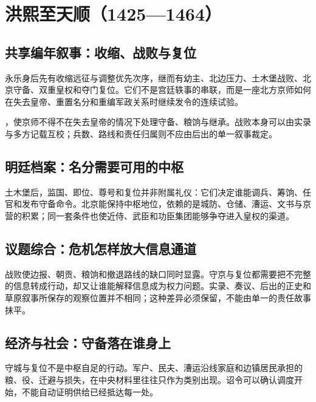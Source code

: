 \chapter{洪熙至天顺（1425—1464）}
\label{ch:hongxi-tianshun}

\section{共享编年叙事：收缩、战败与复位}

永乐身后先有收缩远征与调整优先次序，继而有幼主、北边压力、土木堡战败、北京守备、双重皇权和夺门复位。它们不是宫廷轶事的串联，而是一座北方京师如何在失去皇帝、重置名分和重编军政关系时继续发令的连续试验。

\begin{turningpoint}
，使京师不得不在失去皇帝的情况下处理守备、粮饷与继承。战败本身可以由实录与多方记载互校；兵数、路线和责任归属则不应由后出的单一叙事裁定。
\end{turningpoint}




\section{明廷档案：名分需要可用的中枢}

土木堡后，监国、即位、尊号和复位并非附属礼仪：它们决定谁能调兵、筹饷、任官和发布守备命令。北京能保持中枢地位，依赖的是城防、仓储、漕运、文书与京营的积累；同一套条件也使近侍、武臣和功臣集团能够争夺进入皇权的渠道。

\section{议题综合：危机怎样放大信息通道}

战败使边报、朝贡、粮饷和撤退路线的缺口同时显露。守京与复位都需要把不完整的信息转成行动，却又让谁能解释信息成为权力问题。实录、奏议、后出的正史和草原叙事所保存的观察位置并不相同；这种差异必须保留，不能由单一的责任故事抹平。

\section{经济与社会：守备落在谁身上}

守城与复位不是中枢自足的行动。军户、民夫、漕运沿线家庭和边镇居民承担的粮、役、迁避与损失，在中央材料里往往只作为类别出现。诏令可以确认调度开始，不能自动证明供给已经抵达每一处。


